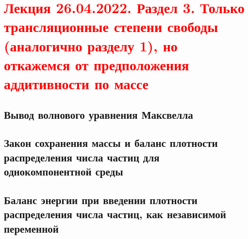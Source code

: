 \documentclass[main.tex]{subfiles}
\begin{document}
\section{\textcolor{red}{Лекция 26.04.2022. Раздел 3. Только трансляционные степени свободы (аналогично разделу 1), но откажемся от предположения аддитивности по массе}}

\subsection{Вывод волнового уравнения Максвелла}

\subsection{Закон сохранения массы и баланс плотности распределения числа частиц для однокомпонентной среды}

\subsection{Баланс энергии при введении плотности распределения числа частиц, как независимой переменной}
\end{document}
